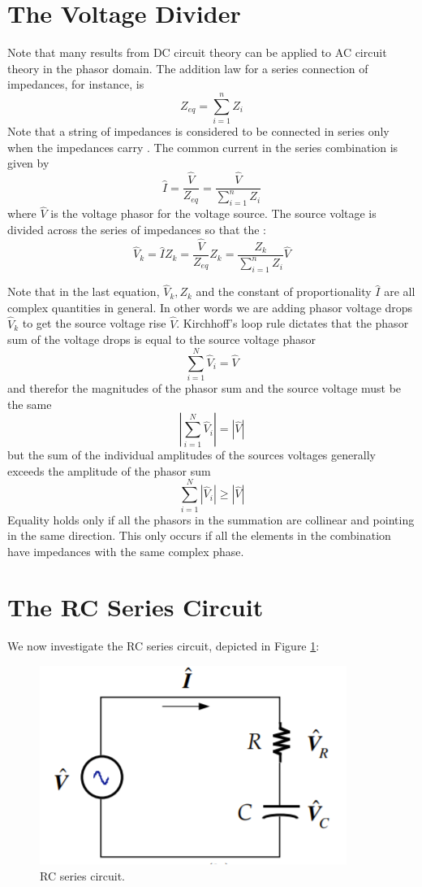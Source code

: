 \section{The Voltage Divider}

Note that many results from DC circuit theory can be applied to AC circuit theory in the phasor domain. The addition law for a series connection of impedances, for instance, is  $$Z_{eq} = \sum_{i=1}^nZ_i$$
Note that a string of impedances is considered to be connected in series only when the impedances carry . The common current in the series combination is given by $$\hat{I} = \frac{\hat{V}}{Z_{eq}} = \frac{\hat{V}}{\sum_{i=1}^nZ_i}$$ where $\hat{V}$ is the voltage phasor for the voltage source. The source voltage is divided across the series of impedances so that the : $$\hat{V}_k = \hat{I}Z_k = \frac{\hat{V}}{Z_{eq}}Z_k = \frac{Z_k}{\sum_{i=1}^nZ_i}\hat{V}$$ 
\begin{note}
    Note that in the last equation, $\hat{V}_k,Z_k$ and the constant of proportionality $\hat{I}$ are all complex quantities in general. In other words we are adding phasor voltage drops $\hat{V}_k$ to get the source voltage rise $\hat{V}$. Kirchhoff's loop rule dictates that the phasor sum of the voltage drops is equal to the source voltage phasor $$\sum_{i=1}^N\hat{V}_i = \hat{V}$$ and therefor the magnitudes of the phasor sum and the source voltage must be the same $$\left|\sum_{i=1}^N\hat{V}_i\right| = |\hat{V}|$$ but the sum of the individual amplitudes of the sources voltages generally exceeds the amplitude of the phasor sum $$\sum_{i=1}^N|\hat{V}_i| \geq |\hat{V}|$$
    Equality holds only if all the phasors in the summation are collinear and pointing in the same direction. This only occurs if all the elements in the combination have impedances with the same complex phase.
\end{note}


\section{The RC Series Circuit}

We now investigate the RC series circuit, depicted in Figure \ref{fig:RCSeries}:

\begin{figure}[H]
    \centering
    \includegraphics[scale = 0.8]{Images/RCSeries.PNG}
    \caption{RC series circuit.}
    \label{fig:RCSeries}
\end{figure}

